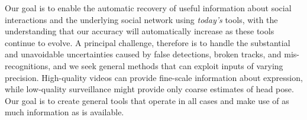 
Our goal is to enable the automatic recovery of useful information about social interactions and the underlying social network using \emph{today's} tools, with the understanding that our accuracy will automatically increase as these tools continue to evolve. A principal challenge, therefore is to handle the substantial and unavoidable uncertainties caused by false detections, broken tracks, and mis-recognitions, and we seek general methods that can exploit inputs of varying precision. High-quality videos can provide fine-scale information about expression, while low-quality surveillance might provide only coarse estimates of head pose. Our goal is to create general tools that operate in all cases and make use of as much information as is available.



